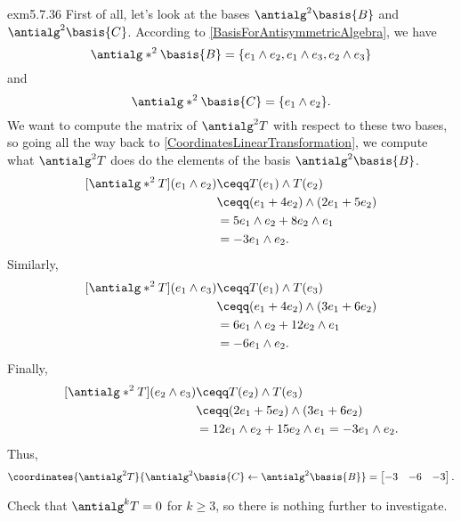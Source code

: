 \begin{exm}{}{exm5.7.36}
	First of all, let's look at the bases $\antialg ^2\basis{B}$ and $\antialg ^2\basis{C}$.  According to \cref{BasisForAntisymmetricAlgebra}, we have
	\begin{equation}
		\antialg* ^2\basis{B}=\{ e_1\wedge e_2,e_1\wedge e_3,e_2\wedge e_3\}
	\end{equation}
	and
	\begin{equation}
		\antialg* ^2\basis{C}=\{ e_1\wedge e_2\} .
	\end{equation}
	We want to compute the matrix of $\antialg ^2T$ with respect to these two bases, so going all the way back to \cref{CoordinatesLinearTransformation}, we compute what $\antialg ^2T$ does do the elements of the basis $\antialg ^2\basis{B}$.
	\begin{equation}
		\begin{split}
			[\antialg* ^2T](e_1\wedge e_2) & \ceqq T(e_1)\wedge T(e_2) \\
			& \ceqq (e_1+4e_2)\wedge (2e_1+5e_2) \\
			& =5e_1\wedge e_2+8e_2\wedge e_1 \\
			& =-3e_1\wedge e_2.
		\end{split}
	\end{equation}
	Similarly,
	\begin{equation}
		\begin{split}
			[\antialg* ^2T](e_1\wedge e_3) & \ceqq T(e_1)\wedge T(e_3) \\
			& \ceqq (e_1+4e_2)\wedge (3e_1+6e_2) \\
			& =6e_1\wedge e_2+12e_2\wedge e_1 \\
			& =-6e_1\wedge e_2.
		\end{split}
	\end{equation}
	Finally,
	\begin{equation}
		\begin{split}
			[\antialg* ^2T](e_2\wedge e_3) & \ceqq T(e_2)\wedge T(e_3) \\
			& \ceqq (2e_1+5e_2)\wedge (3e_1+6e_2) \\
			& =12e_1\wedge e_2+15e_2\wedge e_1=-3e_1\wedge e_2.
		\end{split}
	\end{equation}
	Thus,
	\begin{equation}
		\coordinates{\antialg ^2T}{\antialg ^2\basis{C}\leftarrow \antialg ^2\basis{B}}=\begin{bmatrix}-3 & -6 & -3\end{bmatrix}.
	\end{equation}
	
	\begin{exr}[breakable=false]{}{}
		Check that $\antialg ^kT=0$ for $k\geq 3$, so there is nothing further to investigate.
	\end{exr}
\end{exm}
